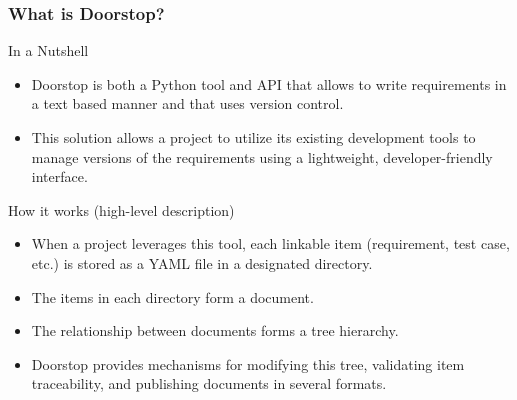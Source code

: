 \documentclass[aspectratio=169]{beamer}
\begin{document}
\begin{frame}
  \frametitle{What is Doorstop?}
  \begin{block}{In a Nutshell}
  \begin{itemize}
    \item Doorstop is both a Python tool and API that allows to write requirements in a text based manner and that uses version control. 
    \item This solution allows a project to utilize its existing development tools to manage versions of the requirements using a lightweight, developer-friendly interface.
  \end{itemize}
  \end{block}
  \begin{block}{How it works (high-level description)}
  \begin{itemize}
  \item When a project leverages this tool, each linkable item (requirement, test case, etc.) is stored as a YAML file in a designated directory. 
  \item The items in each directory form a document.
  \item The relationship between documents forms a tree hierarchy.
  \item Doorstop provides mechanisms for modifying this tree, validating item traceability, and publishing documents in several formats.  
  \end{itemize}

       
  \end{block}

  
\end{frame}
\end{document}
